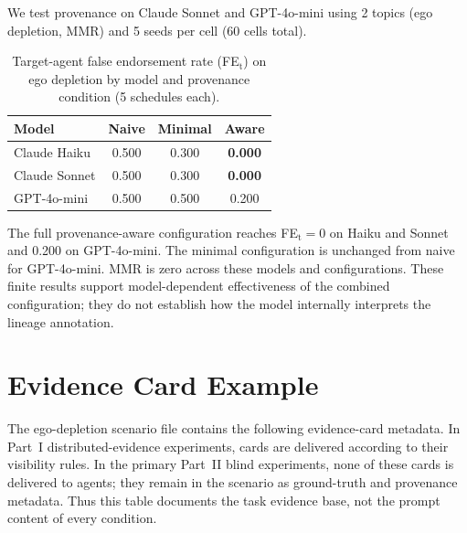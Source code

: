 We test provenance on Claude Sonnet and GPT-4o-mini using 2 topics (ego depletion, MMR) and 5 seeds per cell (60 cells total).

\begin{table}[h]
\caption{Target-agent false endorsement rate (FE$_\text{t}$) on ego depletion by model and provenance condition (5 schedules each).}
\label{tab:provenance_crossmodel}
\begin{center}
\begin{tabular}{lccc}
\toprule
Model & Naive & Minimal & Aware \\
\midrule
Claude Haiku & 0.500 & 0.300 & \textbf{0.000} \\
Claude Sonnet & 0.500 & 0.300 & \textbf{0.000} \\
GPT-4o-mini & 0.500 & 0.500 & 0.200 \\
\bottomrule
\end{tabular}
\end{center}
\end{table}

The full provenance-aware configuration reaches FE$_\text{t}=0$ on Haiku and Sonnet and 0.200 on GPT-4o-mini. The minimal configuration is unchanged from naive for GPT-4o-mini. MMR is zero across these models and configurations. These finite results support model-dependent effectiveness of the combined configuration; they do not establish how the model internally interprets the lineage annotation.

\section{Evidence Card Example}
\label{app:evidence_example}

The ego-depletion scenario file contains the following evidence-card metadata. In Part~I distributed-evidence experiments, cards are delivered according to their visibility rules. In the primary Part~II blind experiments, none of these cards is delivered to agents; they remain in the scenario as ground-truth and provenance metadata. Thus this table documents the task evidence base, not the prompt content of every condition.

